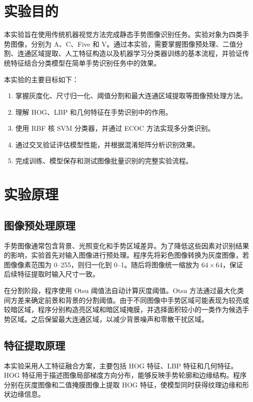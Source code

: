 \documentclass[UTF8,a4paper,10pt]{ctexart}
\begin{document}
\section{实验目的}
本实验旨在使用传统机器视觉方法完成静态手势图像识别任务。实验对象为四类手势图像，分别为 A、C、Five 和 V。通过本实验，需要掌握图像预处理、二值分割、连通区域提取、人工特征构造以及机器学习分类器训练的基本流程，并验证传统特征结合分类模型在简单手势识别任务中的效果。

本实验的主要目标如下：
\begin{enumerate}
  \item 掌握灰度化、尺寸归一化、阈值分割和最大连通区域提取等图像预处理方法。
  \item 理解 HOG、LBP 和几何特征在手势识别中的作用。
  \item 使用 RBF 核 SVM 分类器，并通过 ECOC 方法实现多分类识别。
  \item 通过交叉验证评估模型性能，并根据混淆矩阵分析识别效果。
  \item 完成训练、模型保存和测试图像批量识别的完整实验流程。
\end{enumerate}

\section{实验原理}
\subsection{图像预处理原理}
手势图像通常包含背景、光照变化和手势区域差异。为了降低这些因素对识别结果的影响，实验首先对输入图像进行预处理。程序先将彩色图像转换为灰度图像，若图像像素范围为 0--255，则归一化到 0--1。随后将图像统一缩放为 $64\times64$，保证后续特征提取时输入尺寸一致。

在分割阶段，程序使用 Otsu 阈值法自动计算灰度阈值。Otsu 方法通过最大化类间方差来确定前景和背景的分割阈值\cite{otsu1979threshold}。由于不同图像中手势区域可能表现为较亮或较暗区域，程序分别构造亮区域和暗区域掩膜，并选择面积较小的一类作为候选手势区域。之后保留最大连通区域，以减少背景噪声和零散干扰区域。

\subsection{特征提取原理}
本实验采用人工特征融合方案，主要包括 HOG 特征、LBP 特征和几何特征。HOG 特征用于描述图像局部梯度方向分布，能够反映手势轮廓和边缘结构\cite{dalal2005histograms}。程序分别在灰度图像和二值掩膜图像上提取 HOG 特征，使模型同时获得纹理边缘和形状边缘信息。
\end{document}
